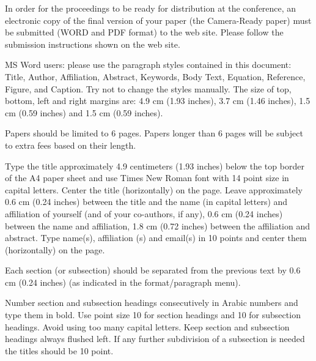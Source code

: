 \documentclass[a4paper, times, 10pt,twocolumn]{article}
\begin{document}

In order for the proceedings to be ready for distribution at the conference, an electronic copy of the final version of your paper (the Camera-Ready paper) must be submitted (WORD and PDF format) to the web site. Please follow the submission instructions shown on the web site.


MS Word users: please use the paragraph styles contained in this document: Title, Author, Affiliation, Abstract, Keywords, Body Text, Equation, Reference, Figure, and Caption. Try not to change the styles manually. The size of top, bottom, left and right margins are: 4.9 cm (1.93 inches), 3.7 cm (1.46 inches), 1.5 cm (0.59 inches) and 1.5 cm (0.59 inches).


Papers should be limited to 6 pages. Papers longer than 6 pages will be subject to extra fees based on their length.


Type the title approximately 4.9 centimeters (1.93 inches) below the top border of the A4 paper sheet and use Times New Roman font with 14 point size in capital letters. Center the title (horizontally) on the page. Leave approximately 0.6 cm (0.24 inches) between the title and the name (in capital letters) and affiliation of yourself (and of your co-authors, if any), 0.6 cm (0.24 inches) between the name and affiliation, 1.8 cm (0.72 inches) between the affiliation and abstract. Type name(s), affiliation (s) and email(s) in 10 points and center them (horizontally) on the page.


Each section (or subsection) should be separated from the previous text by 0.6 cm (0.24 inches) (as indicated in the format/paragraph menu).


Number section and subsection headings consecutively in Arabic numbers and type them in bold. Use point size 10 for section headings and 10 for subsection headings. Avoid using too many capital letters. Keep section and subsection headings always flushed left. If any further subdivision of a subsection is needed the titles should be 10 point.
\end{document}
